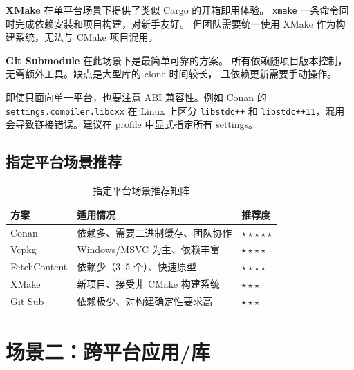 \documentclass[12pt,a4paper,fontset=fandol]{ctexbook}
\begin{document}
\textbf{XMake} 在单平台场景下提供了类似 Cargo 的开箱即用体验。
\texttt{xmake} 一条命令同时完成依赖安装和项目构建，对新手友好。
但团队需要统一使用 XMake 作为构建系统，无法与 CMake 项目混用。

\textbf{Git Submodule} 在此场景下是最简单可靠的方案。
所有依赖随项目版本控制，无需额外工具。缺点是大型库的 clone 时间较长，
且依赖更新需要手动操作。

\begin{warning}[ title={指定平台场景下的常见陷阱}]
即使只面向单一平台，也要注意 ABI 兼容性。例如 Conan 的
\texttt{settings.\allowbreak{}compiler.\allowbreak{}libcxx} 在 Linux 上区分 \texttt{libstdc++} 和
\texttt{libstdc++11}，混用会导致链接错误。建议在 profile 中显式指定所有 settings。
\end{warning}

\subsection{指定平台场景推荐}

\begin{table}[H]
\centering
\caption{指定平台场景推荐矩阵}
\label{tab:scenario1}
\small
\begin{tabularx}{\textwidth}{l X l}
\toprule
\textbf{方案} & \textbf{适用情况} & \textbf{推荐度} \\
\midrule
Conan      & 依赖多、需要二进制缓存、团队协作 & $\star\star\star\star\star$ \\
Vcpkg      & Windows/MSVC 为主、依赖丰富   & $\star\star\star\star$ \\
FetchContent & 依赖少（3--5 个）、快速原型  & $\star\star\star\star$ \\
XMake      & 新项目、接受非 CMake 构建系统 & $\star\star\star$ \\
Git Sub    & 依赖极少、对构建确定性要求高   & $\star\star\star$ \\
\bottomrule
\end{tabularx}
\end{table}

\section{场景二：跨平台应用/库}
\end{document}
